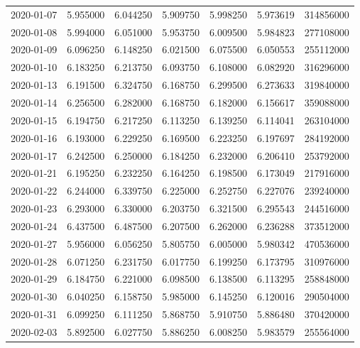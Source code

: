 \begin{tabular}{lrrrrrr}
2020-01-07 &    5.955000 &    6.044250 &    5.909750 &    5.998250 &    5.973619 &   314856000 \\
2020-01-08 &    5.994000 &    6.051000 &    5.953750 &    6.009500 &    5.984823 &   277108000 \\
2020-01-09 &    6.096250 &    6.148250 &    6.021500 &    6.075500 &    6.050553 &   255112000 \\
2020-01-10 &    6.183250 &    6.213750 &    6.093750 &    6.108000 &    6.082920 &   316296000 \\
2020-01-13 &    6.191500 &    6.324750 &    6.168750 &    6.299500 &    6.273633 &   319840000 \\
2020-01-14 &    6.256500 &    6.282000 &    6.168750 &    6.182000 &    6.156617 &   359088000 \\
2020-01-15 &    6.194750 &    6.217250 &    6.113250 &    6.139250 &    6.114041 &   263104000 \\
2020-01-16 &    6.193000 &    6.229250 &    6.169500 &    6.223250 &    6.197697 &   284192000 \\
2020-01-17 &    6.242500 &    6.250000 &    6.184250 &    6.232000 &    6.206410 &   253792000 \\
2020-01-21 &    6.195250 &    6.232250 &    6.164250 &    6.198500 &    6.173049 &   217916000 \\
2020-01-22 &    6.244000 &    6.339750 &    6.225000 &    6.252750 &    6.227076 &   239240000 \\
2020-01-23 &    6.293000 &    6.330000 &    6.203750 &    6.321500 &    6.295543 &   244516000 \\
2020-01-24 &    6.437500 &    6.487500 &    6.207500 &    6.262000 &    6.236288 &   373512000 \\
2020-01-27 &    5.956000 &    6.056250 &    5.805750 &    6.005000 &    5.980342 &   470536000 \\
2020-01-28 &    6.071250 &    6.231750 &    6.017750 &    6.199250 &    6.173795 &   310976000 \\
2020-01-29 &    6.184750 &    6.221000 &    6.098500 &    6.138500 &    6.113295 &   258848000 \\
2020-01-30 &    6.040250 &    6.158750 &    5.985000 &    6.145250 &    6.120016 &   290504000 \\
2020-01-31 &    6.099250 &    6.111250 &    5.868750 &    5.910750 &    5.886480 &   370420000 \\
2020-02-03 &    5.892500 &    6.027750 &    5.886250 &    6.008250 &    5.983579 &   255564000 \\

\end{tabular}
